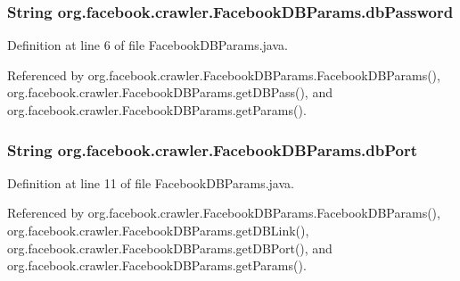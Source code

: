 \hypertarget{classorg_1_1facebook_1_1crawler_1_1_facebook_d_b_params_a657c173c9d823eaba4721f6eaa2ede3f}{
\subsubsection[{db\-Password}]{\setlength{\rightskip}{0pt plus 5cm}String org.\-facebook.\-crawler.\-Facebook\-D\-B\-Params.\-db\-Password\hspace{0.3cm}{\ttfamily [private]}}}\label{classorg_1_1facebook_1_1crawler_1_1_facebook_d_b_params_a657c173c9d823eaba4721f6eaa2ede3f}


Definition at line 6 of file Facebook\-D\-B\-Params.\-java.



Referenced by org.\-facebook.\-crawler.\-Facebook\-D\-B\-Params.\-Facebook\-D\-B\-Params(), org.\-facebook.\-crawler.\-Facebook\-D\-B\-Params.\-get\-D\-B\-Pass(), and org.\-facebook.\-crawler.\-Facebook\-D\-B\-Params.\-get\-Params().

\hypertarget{classorg_1_1facebook_1_1crawler_1_1_facebook_d_b_params_ad96c828b8283b58569f4560dacb0145d}{
\subsubsection[{db\-Port}]{\setlength{\rightskip}{0pt plus 5cm}String org.\-facebook.\-crawler.\-Facebook\-D\-B\-Params.\-db\-Port\hspace{0.3cm}{\ttfamily [private]}}}\label{classorg_1_1facebook_1_1crawler_1_1_facebook_d_b_params_ad96c828b8283b58569f4560dacb0145d}


Definition at line 11 of file Facebook\-D\-B\-Params.\-java.



Referenced by org.\-facebook.\-crawler.\-Facebook\-D\-B\-Params.\-Facebook\-D\-B\-Params(), org.\-facebook.\-crawler.\-Facebook\-D\-B\-Params.\-get\-D\-B\-Link(), org.\-facebook.\-crawler.\-Facebook\-D\-B\-Params.\-get\-D\-B\-Port(), and org.\-facebook.\-crawler.\-Facebook\-D\-B\-Params.\-get\-Params().

